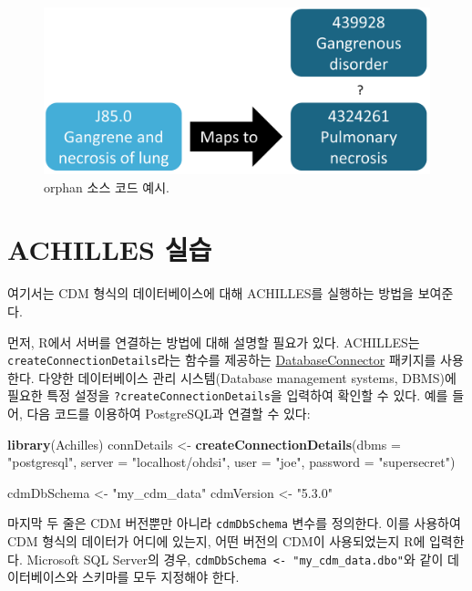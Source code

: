 \documentclass[11pt]{book}
\newenvironment{Shaded}{\begin{snugshade}}{\end{snugshade}}
\newcommand{\KeywordTok}[1]{\textcolor[rgb]{0.13,0.29,0.53}{\textbf{#1}}}
\newcommand{\DataTypeTok}[1]{\textcolor[rgb]{0.13,0.29,0.53}{#1}}
\newcommand{\StringTok}[1]{\textcolor[rgb]{0.31,0.60,0.02}{#1}}
\newcommand{\NormalTok}[1]{#1}
\theoremstyle{definition}
\theoremstyle{definition}
\theoremstyle{definition}
\theoremstyle{remark}
\begin{document}
\begin{figure}

{\centering \includegraphics[width=0.7\linewidth]{images/DataQuality/missingMapping} 

}

\caption{orphan 소스 코드 예시. }\label{fig:missingMapping}
\end{figure}

\section{ACHILLES 실습}\label{achillesInPractice}

여기서는 CDM 형식의 데이터베이스에 대해 ACHILLES를 실행하는 방법을
보여준다.

먼저, R에서 서버를 연결하는 방법에 대해 설명할 필요가 있다. ACHILLES는
\texttt{createConnectionDetails}라는 함수를 제공하는
\href{https://ohdsi.github.io/DatabaseConnector/}{DatabaseConnector}
패키지를 사용한다. 다양한 데이터베이스 관리 시스템(Database management
systems, DBMS)에 필요한 특정 설정을 \texttt{?createConnectionDetails}을
입력하여 확인할 수 있다. 예를 들어, 다음 코드를 이용하여 PostgreSQL과
연결할 수 있다:

\begin{Shaded}
\begin{Highlighting}[]
\KeywordTok{library}\NormalTok{(Achilles)}
\NormalTok{connDetails <-}\StringTok{ }\KeywordTok{createConnectionDetails}\NormalTok{(}\DataTypeTok{dbms =} \StringTok{"postgresql"}\NormalTok{,}
                                       \DataTypeTok{server =} \StringTok{"localhost/ohdsi"}\NormalTok{,}
                                       \DataTypeTok{user =} \StringTok{"joe"}\NormalTok{,}
                                       \DataTypeTok{password =} \StringTok{"supersecret"}\NormalTok{)}

\NormalTok{cdmDbSchema <-}\StringTok{ "my_cdm_data"}
\NormalTok{cdmVersion <-}\StringTok{ "5.3.0"}
\end{Highlighting}
\end{Shaded}

마지막 두 줄은 CDM 버전뿐만 아니라 \texttt{cdmDbSchema} 변수를 정의한다.
이를 사용하여 CDM 형식의 데이터가 어디에 있는지, 어떤 버전의 CDM이
사용되었는지 R에 입력한다. Microsoft SQL Server의 경우,
\texttt{cdmDbSchema\ \textless{}-\ "my\_cdm\_data.dbo"}와 같이
데이터베이스와 스키마를 모두 지정해야 한다.
\end{document}
